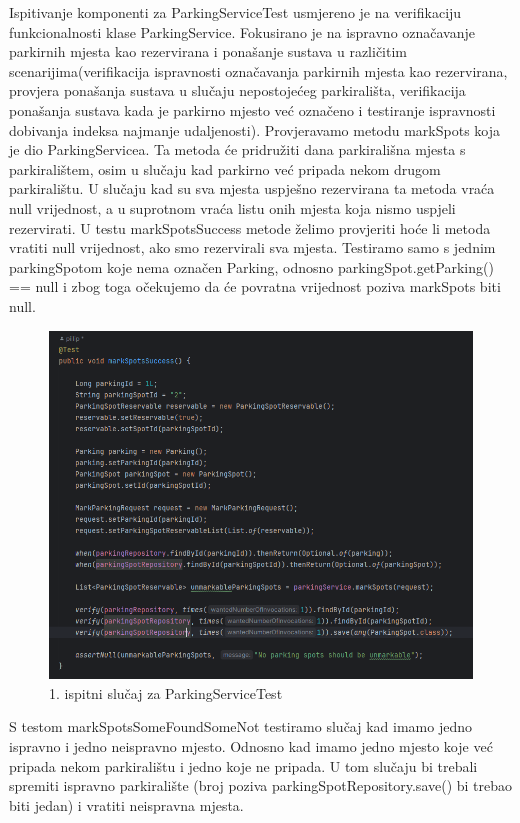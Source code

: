 Ispitivanje komponenti za ParkingServiceTest usmjereno je na verifikaciju funkcionalnosti klase ParkingService. Fokusirano je na ispravno označavanje parkirnih mjesta kao rezervirana i ponašanje sustava u različitim scenarijima(verifikacija ispravnosti označavanja parkirnih mjesta kao rezervirana, provjera ponašanja sustava u slučaju nepostojećeg parkirališta, verifikacija ponašanja sustava kada je parkirno mjesto već označeno i testiranje ispravnosti dobivanja indeksa najmanje udaljenosti). Provjeravamo metodu markSpots koja je dio ParkingServicea. 
Ta metoda će pridružiti dana parkirališna mjesta s parkiralištem, osim u slučaju kad parkirno već pripada nekom drugom parkiralištu. U slučaju kad su sva mjesta uspješno rezervirana ta metoda vraća null vrijednost, a u suprotnom vraća listu onih mjesta koja nismo uspjeli rezervirati.
U testu markSpotsSuccess metode želimo provjeriti hoće li metoda vratiti null vrijednost, ako smo rezervirali sva mjesta. Testiramo samo s jednim parkingSpotom koje nema označen Parking, odnosno parkingSpot.getParking() == null i zbog toga očekujemo da će povratna vrijednost poziva markSpots biti null. 

\begin{figure}[H]
	\includegraphics[width=\textwidth]{slike/markspotsuccess.png} %
	\centering
	\caption{1. ispitni slučaj za ParkingServiceTest}
	\label{fig:dijagramstanja}
\end{figure}


S testom markSpotsSomeFoundSomeNot testiramo slučaj kad imamo jedno ispravno i jedno neispravno mjesto. Odnosno kad imamo jedno mjesto koje već pripada nekom parkiralištu i jedno koje ne pripada. U tom slučaju bi trebali spremiti ispravno parkiralište (broj poziva parkingSpotRepository.save() bi trebao biti jedan) i vratiti neispravna mjesta.


